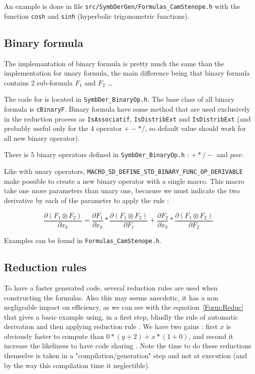 An example is done in file {\tt src/SymbDerGen/Formulas\_CamStenope.h} with the function
{\tt cosh} and {\tt sinh}  (hyperbolic trigonometric functions).


\subsection{Binary formula}

The implemantation of binary formula is pretty much the same than the implementation for unary formula,
the main difference being that binary formula contains 2 sub-formula $F_1$ and $F_2$ \dots

The code for is located in {\tt SymbDer\_BinaryOp.h}.  The base class of all binary formula is
{\tt cBinaryF}.  Binary formula have some method that are used exclusively in the reduction process 
as {\tt IsAssociatif},  {\tt IsDistribExt} and {\tt IsDistribExt}  (and probably useful only
for the $4$ operator $+-*/$, so default value should work for all new binary operator).

There is $5$ binary operators defined in  {\tt SymbDer\_BinaryOp.h} : $+*/-$ and $pow$.

Like with unary operators, {\tt MACRO\_SD\_DEFINE\_STD\_BINARY\_FUNC\_OP\_DERIVABLE}
make possible to create a new binary operator with a single macro.
This macro take one more parameters than unary one, becasuse  we must indicate the two
derivative by each of the parameter to apply the rule :

\begin{equation}
        \frac{\partial (F_1 \otimes F_2)} {\partial x_k} 
     =   \frac{\partial F_1 } {\partial x_k} * \frac{\partial (F_1 \otimes F_2)} {\partial F_1} 
       + \frac{\partial F_2 } {\partial x_k} * \frac{\partial (F_1 \otimes F_2)} {\partial F_2} 
\end{equation}

Examples can be found in {\tt Formulas\_CamStenope.h}.



\subsection{Reduction rules}

\label{Reduc:Rule}

To have a faster generated code, several reduction rules are used when 
constructing the formulas. Also this may seems anecdotic,
it has a non negligeable  impact on efficiency, as we can see with the equation~\ref{Form:Reduc}
that gives a basic example using, in a first step, blindly the 
rule of automatic derivation and then applying reduction rule .
We have two gains : first $x$ is obviously faster to compute than $0 * (y+2) + x * (1 + 0)$,
and second it increase the likeliness to have code sharing . Note the time to do
these reductions themselve is taken in a "compilation/generation" step and not at execution
(and by the way this compilation time it neglectible).

